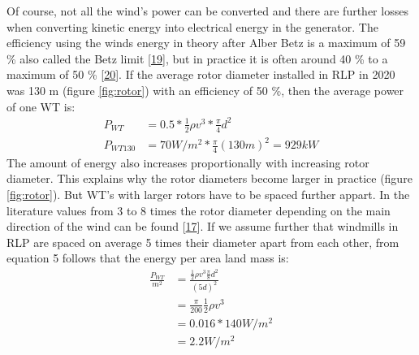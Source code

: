 \documentclass[a4paper,11pt]{article}
\begin{document}
Of course, not all the wind's power can be converted and there are further losses when converting kinetic energy into electrical energy in the generator. The efficiency using the winds energy in theory after Alber Betz is a maximum of 59 \% also called the Betz limit {[}\protect\hyperlink{ref-A.Betz.1920}{19}{]}, but in practice it is often around 40 \% to a maximum of 50 \% {[}\protect\hyperlink{ref-WindwartsEnergieausdemNorden.2021}{20}{]}. If the average rotor diameter installed in RLP in 2020 was 130 m (figure \ref{fig:rotor}) with an efficiency of 50 \%, then the average power of one WT is:
\begin{equation}
\begin{split}
P_{WT} & = 0.5 * \frac{1}{2} \rho v^3 * \frac{\pi}{4}d^2 \\
P_{WT130} & = 70 W/m^2 * \frac{\pi}{4}(130 m)^2 = 929 kW
\end{split}
\end{equation}
The amount of energy also increases proportionally with increasing rotor diameter. This explains why the rotor diameters become larger in practice (figure \ref{fig:rotor}). But WT's with larger rotors have to be spaced further appart. In the literature values from 3 to 8 times the rotor diameter depending on the main direction of the wind can be found {[}\protect\hyperlink{ref-DavidJCMacKay.2009}{17}{]}. If we assume further that windmills in RLP are spaced on average 5 times their diameter apart from each other, from equation 5 follows that the energy per area land mass is:
\begin{equation}
\begin{split}
\frac{P_{WT}}{m^2} & = \frac{\frac{1}{2} \rho v^3 \frac{\pi}{8}d^2}{(5d)^2} \\
 & = \frac{\pi}{200} \frac{1}{2} \rho v^3 \\
 & = 0.016 * 140 W/m^2 \\
 & = 2.2 W/m^2
\end{split}
\end{equation}
\end{document}
